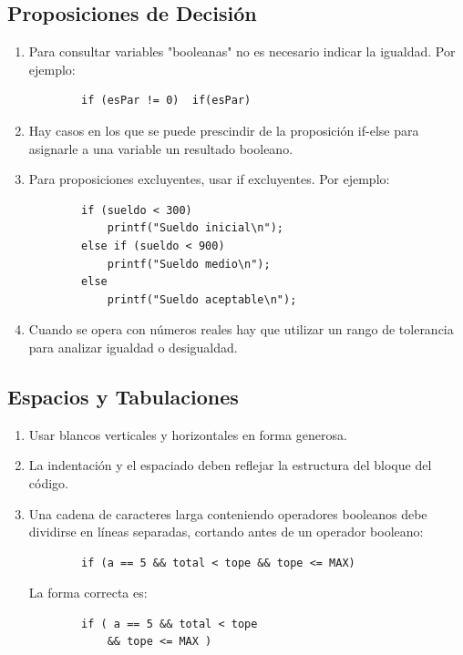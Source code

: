 \documentclass{article}
\begin{document}
\subsection{Proposiciones de Decisión}
\begin{enumerate}
    \item Para consultar variables "booleanas" no es necesario indicar la igualdad.
    Por ejemplo:
    \begin{lstlisting}
        if (esPar != 0)  if(esPar)
    \end{lstlisting}
    \item Hay casos en los que se puede prescindir de la proposición if-else para asignarle a una variable un resultado booleano.
    \item Para proposiciones excluyentes, usar if excluyentes. Por ejemplo:
    \begin{lstlisting}
        if (sueldo < 300)
            printf("Sueldo inicial\n");
        else if (sueldo < 900)
            printf("Sueldo medio\n");
        else
            printf("Sueldo aceptable\n");
    \end{lstlisting}
    \item Cuando se opera con números reales hay que utilizar un rango de tolerancia para analizar igualdad o desigualdad.
\end{enumerate}

\subsection{Espacios y Tabulaciones}
\begin{enumerate}
    \item Usar blancos verticales y horizontales en forma generosa.
    \item La indentación y el espaciado deben reflejar la estructura del bloque del
código.
    \item Una cadena de caracteres larga conteniendo operadores booleanos debe dividirse en líneas separadas, cortando antes de un operador booleano:
    \begin{lstlisting}
        if (a == 5 && total < tope && tope <= MAX)
    \end{lstlisting}
    La forma correcta es:
    \begin{lstlisting}
        if ( a == 5 && total < tope
            && tope <= MAX )
    \end{lstlisting}
\end{enumerate}
\end{document}
